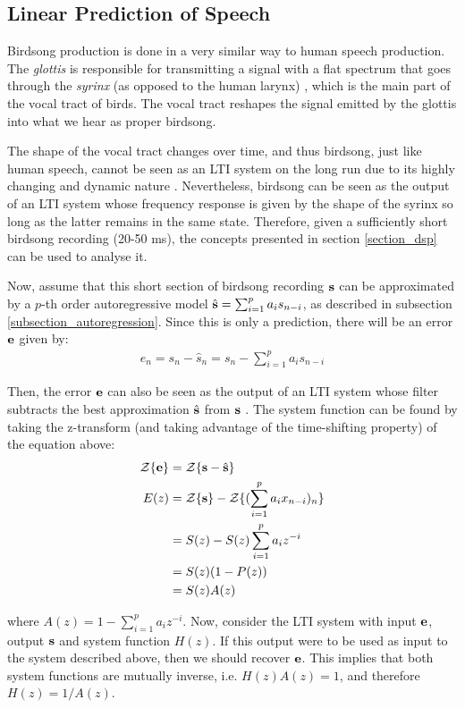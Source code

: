 \documentclass[../main.tex]{subfiles}
\begin{document}
\subsection{Linear Prediction of Speech} \label{subsection_lpc}
\par Birdsong production is done in a very similar way to human speech production. The \emph{glottis} is responsible for transmitting a signal with a flat spectrum that goes through the \emph{syrinx} (as opposed to the human larynx) \cite{Wissman2006}, which is the main part of the vocal tract of birds. The vocal tract reshapes the signal emitted by the glottis into what we hear as proper birdsong. 
\par The shape of the vocal tract changes over time, and thus birdsong, just like human speech, cannot be seen as an LTI system on the long run due to its highly changing and dynamic nature \cite{Teplitsky2000}. Nevertheless, birdsong can be seen as the output of an LTI system whose frequency response is given by the shape of the syrinx so long as the latter remains in the same state. Therefore, given a sufficiently short birdsong recording (20-50 ms), the concepts presented in section \ref{section_dsp} can be used to analyse it.
\par Now, assume that this short section of birdsong recording $\mathbf{s}$ can be approximated by a $p$-th order autoregressive model $\hat{\mathbf{s}} = \sum_{i=1}^pa_is_{n-i}$, as described in subsection \ref{subsection_autoregression}. Since this is only a prediction, there will be an error $\mathbf{e}$ given by:
\begin{align*}
e_n = s_n - \hat{s}_n = s_n - \sum_{i=1}^pa_is_{n-i}
\end{align*}
\par Then, the error $\mathbf{e}$ can also be seen as the output of an LTI system whose filter subtracts the best approximation $\hat{\mathbf{s}}$ from $\mathbf{s}$ \cite{Bello}. The system function can be found by taking the z-transform (and taking advantage of the time-shifting property) of the equation above:
\begin{align*}
\mathcal{Z}\{\mathbf{e}\} &= \mathcal{Z}\{\mathbf{s} - \hat{\mathbf{s}}\}\\
E(z) &= \mathcal{Z}\{\mathbf{s}\} - \mathcal{Z}\{ (\sum_{i=1}^pa_ix_{n-i})_n\} \\
 &= S(z) - S(z)\sum_{i=1}^pa_iz^{-i}\\
 &= S(z)(1 - P(z))\\
 &= S(z)A(z) 
\end{align*}
\par where $A(z) = 1 - \sum_{i=1}^pa_iz^{-i}$. Now, consider the LTI system with input $\mathbf{e}$, output $\mathbf{s}$ and system function $H(z)$. If this output were to be used as input to the system described above, then we should recover $\mathbf{e}$. This implies that both system functions are mutually inverse, i.e. $H(z)A(z) = 1$, and therefore $H(z) = 1/A(z)$. 
\end{document}
